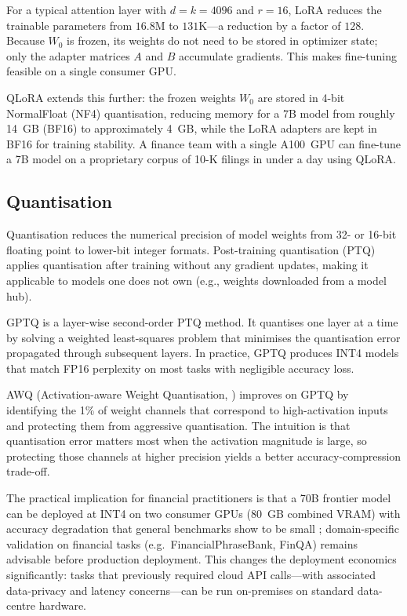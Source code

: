 \begin{deepdive}
For a typical attention layer with $d = k = 4096$ and $r = 16$, LoRA reduces the
trainable parameters from $16.8\text{M}$ to $131\text{K}$---a reduction by a factor
of $128$.  Because $W_0$ is frozen, its weights do not need to be stored in optimizer
state; only the adapter matrices $A$ and $B$ accumulate gradients.  This makes
fine-tuning feasible on a single consumer GPU.

QLoRA \citep{dettmers2023qlora} extends this further: the frozen weights $W_0$ are
stored in 4-bit NormalFloat (NF4) quantisation, reducing memory for a 7B model from
roughly 14~GB (BF16) to approximately 4~GB, while the LoRA adapters are kept in
BF16 for training stability.  A finance team with a single A100~GPU can fine-tune a
7B model on a proprietary corpus of 10-K filings in under a day using QLoRA.

\subsection{Quantisation}
\label{sec:distillation-quant}

Quantisation reduces the numerical precision of model weights from 32- or 16-bit
floating point to lower-bit integer formats.  Post-training quantisation (PTQ) applies
quantisation after training without any gradient updates, making it applicable to
models one does not own (e.g., weights downloaded from a model hub).

GPTQ \citep{frantar2022gptq} is a layer-wise second-order PTQ method.  It quantises
one layer at a time by solving a weighted least-squares problem that minimises the
quantisation error propagated through subsequent layers.  In practice, GPTQ produces
INT4 models that match FP16 perplexity on most tasks with negligible accuracy loss.

AWQ (Activation-aware Weight Quantisation, \citet{lin2023awq}) improves on GPTQ
by identifying the 1\% of weight channels that correspond to high-activation inputs
and protecting them from aggressive quantisation.  The intuition is that quantisation
error matters most when the activation magnitude is large, so protecting those
channels at higher precision yields a better accuracy-compression trade-off.

The practical implication for financial practitioners is that a 70B frontier model
can be deployed at INT4 on two consumer GPUs (80~GB combined VRAM) with accuracy
degradation that general benchmarks show to be small \citep{frantar2022gptq,lin2023awq};
domain-specific validation on financial tasks (e.g.\ FinancialPhraseBank, FinQA)
remains advisable before production deployment.  This changes the deployment
economics significantly: tasks that previously required cloud API calls---with
associated data-privacy and latency concerns---can be run on-premises on standard
data-centre hardware.


\end{deepdive}

